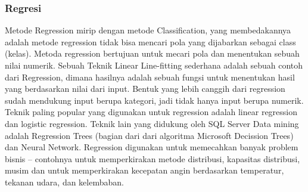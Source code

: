 \subsubsection{Regresi}
\hfill\break
Metode Regression mirip dengan metode Classification, yang membedakannya adalah metode regression tidak bisa mencari pola yang dijabarkan sebagai class (kelas).
\noindent
Metoda regression bertujuan untuk mecari pola dan menentukan sebuah nilai numerik.
\noindent
Sebuah Teknik Linear Line-fitting sederhana adalah sebuah contoh dari Regression, dimana hasilnya adalah sebuah fungsi untuk menentukan hasil yang berdasarkan nilai dari input.
\noindent
Bentuk yang lebih canggih dari regression sudah mendukung input berupa kategori, jadi tidak hanya input berupa numerik. Teknik paling popular yang digunakan untuk regression adalah linear regression dan logistic regression. Teknik lain yang didukung oleh SQL Server Data mining adalah Regression Trees (bagian dari dari algoritma Microsoft Decission Trees) dan Neural Network.
\noindent
Regression digunakan untuk memecahkan banyak problem bisnis – contohnya untuk memperkirakan metode distribusi, kapasitas distribusi, musim dan untuk memperkirakan kecepatan angin berdasarkan temperatur, tekanan udara, dan kelembaban.
